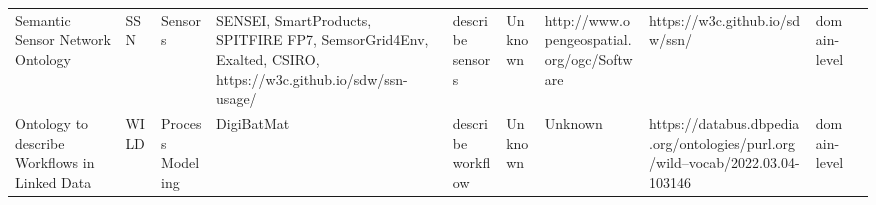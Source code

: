 \begin{tabular}{llllllllll}
                                                 Semantic Sensor Network Ontology &                     SSN &                                     Sensors &                                                                                                                                                                                                                                                            SENSEI, SmartProducts, SPITFIRE FP7, SemsorGrid4Env, Exalted, CSIRO, https://w3c.github.io/sdw/ssn-usage/ &                                                                                                                                                                                                                                                                                                                                                                                       describe sensors &                                                                                                            Unknown &   http://www.opengeospatial.org/ogc/Software &                                                                     https://w3c.github.io/sdw/ssn/ &      domain-level \\
                                    Ontology to describe Workflows in Linked Data &                    WILD &                            Process Modeling &                                                                                                                                                                                                                                                                                                                                                           DigiBatMat &                                                                                                                                                                                                                                                                                                                                                                                      describe workflow &                                                                                                            Unknown &                                      Unknown &                      https://databus.dbpedia.org/ontologies/purl.org/wild--vocab/2022.03.04-103146 &      domain-level \\
\bottomrule
\end{tabular}
